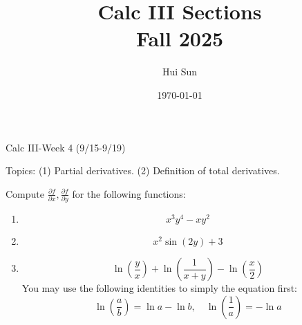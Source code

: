 \documentclass[openany]{book}
\title{Calc III Sections
\\ 
\vspace{0.4cm}
\large Fall 2025}
\date{\today}
\author{Hui Sun}
\begin{document}
\maketitle

\newpage


\begin{center}
    \Large Calc III-Week 4 (9/15-9/19)
\end{center}

\renewcommand\thesection{\arabic{section}}

\noindent
Topics: (1) Partial derivatives. (2) Definition of total derivatives.

\begin{prob}
    Compute $\frac{\partial f}{\partial x}, \frac{\partial f}{\partial y}$ for the following functions:
    \begin{enumerate}
        \item \begin{equation*}
            x^3y^4-xy^2
        \end{equation*}
        \item \begin{equation*}
            x^2\sin(2y)+3
        \end{equation*}
        \item \begin{equation*}
            \ln\left(\frac{y}{x}\right)+\ln\left(\frac{1}{x+y}\right)-\ln\left(\frac{x}{2}\right)
        \end{equation*}
        You may use the following identities to simply the equation first:
        \begin{equation*}
            \ln\left(\frac{a}{b}\right)=\ln a-\ln b, \quad \ln\left(\frac{1}{a}\right)=-\ln a
        \end{equation*}
    \end{enumerate}
\end{prob}
\end{document}
